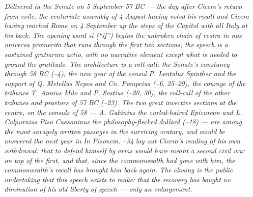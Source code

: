 
\textit{Delivered in the Senate on 5 September 57 BC --- the
day after Cicero's return from exile, the centuriate
assembly of 4 August having voted his recall and Cicero
having reached Rome on 4 September up the steps of the
Capitol with all Italy at his back. The opening word
\textit{si} (``if'') begins the unbroken chain of
\textit{vestra in nos universa promerita} that runs through
the first two sections; the speech is a sustained
\textit{gratiarum actio}, with no narrative element except
what is needed to ground the gratitude. The architecture is
a roll-call: the Senate's constancy through 58 BC
(--4), the new year of the consul P. Lentulus
Spinther and the support of Q. Metellus Nepos and Cn. Pompeius
(--6, 25--29), the courage of the tribunes
T. Annius Milo and P. Sestius (--20, 30), the
roll-call of the other tribunes and praetors of 57 BC
(--23). The two great invective sections at
the centre, on the consuls of 58 --- A. Gabinius the
curled-haired Epicurean and L. Calpurnius Piso Caesoninus the
philosophy-flecked dullard (--18) --- are
among the most savagely written passages in the surviving
oratory, and would be answered the next year in
\textit{In Pisonem}. --34 lay out Cicero's
reading of his own withdrawal: that to defend himself by arms
would have meant a second civil war on top of the first, and
that, since the commonwealth had gone with him, the
commonwealth's recall has brought him back again. The closing
 is the public undertaking that this speech
exists to make: that the recovery has bought no diminution of
his old liberty of speech --- only an enlargement.}
